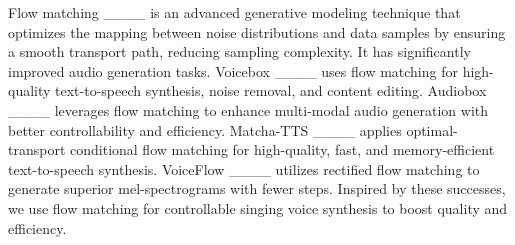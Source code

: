 Flow matching ____ is an advanced generative modeling technique that optimizes the mapping between noise distributions and data samples by ensuring a smooth transport path, reducing sampling complexity. It has significantly improved audio generation tasks.
Voicebox ____ uses flow matching for high-quality text-to-speech synthesis, noise removal, and content editing.
Audiobox ____ leverages flow matching to enhance multi-modal audio generation with better controllability and efficiency. 
Matcha-TTS ____ applies optimal-transport conditional flow matching for high-quality, fast, and memory-efficient text-to-speech synthesis. 
VoiceFlow ____ utilizes rectified flow matching to generate superior mel-spectrograms with fewer steps.
Inspired by these successes, we use flow matching for controllable singing voice synthesis to boost quality and efficiency.
